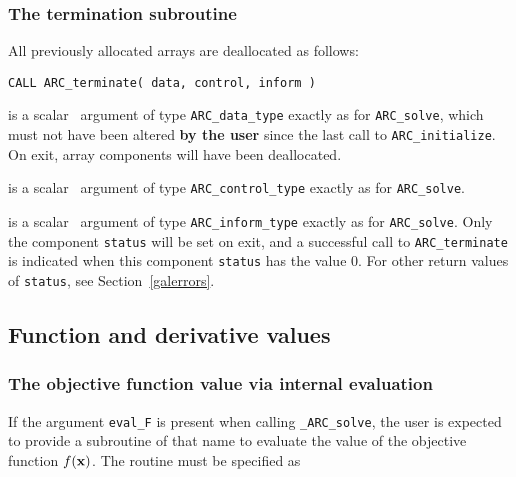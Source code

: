 \documentclass{galahad}
\newcommand{\packagename}{ARC}
\newcommand{\fullpackagename}{\libraryname\_\packagename}
\newcommand{\solver}{{\tt \fullpackagename\_solve}}
\begin{document}

\subsubsection{The  termination subroutine}
All previously allocated arrays are deallocated as follows:
\vspace*{1mm}

\hspace{8mm}
{\tt CALL \packagename\_terminate( data, control, inform )}

\vspace*{-1mm}
\begin{description}

 is a scalar \intentinout\ argument of type
{\tt \packagename\_data\_type}
exactly as for
{\tt \packagename\_solve},
which must not have been altered {\bf by the user} since the last call to
{\tt \packagename\_initialize}.
On exit, array components will have been deallocated.

 is a scalar \intentin\ argument of type
{\tt \packagename\_control\_type}
exactly as for
{\tt \packagename\_solve}.

 is a scalar \intentout\ argument of type
{\tt \packagename\_inform\_type}
exactly as for
{\tt \packagename\_solve}.
Only the component {\tt status} will be set on exit, and a
successful call to
{\tt \packagename\_terminate}
is indicated when this  component {\tt status} has the value 0.
For other return values of {\tt status}, see Section~\ref{galerrors}.

\end{description}


\subsection{Function and derivative values\label{fdv}}


\subsubsection{The objective function value via internal evaluation\label{ffv}}

If the argument {\tt eval\_F} is present when calling \solver, the
user is expected to provide a subroutine of that name to evaluate the
value of the objective function $f({\mathbf{x}})$.
The routine must be specified as
\end{document}
